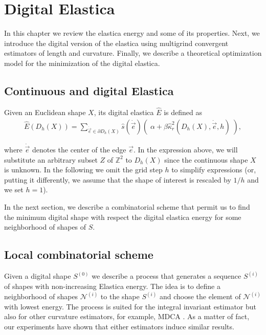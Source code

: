 \chapter{Digital Elastica}
\label{chapter:digital-elastica}

In this chapter we review the elastica energy and some of its properties. Next, we introduce the digital version of the elastica using multigrind convergent estimators of length and curvature. Finally, we describe a theoretical optimization model for the minimization of the digital elastica.

\section{Continuous and digital Elastica}
\label{ch6:sec:continuous-digital-elastica}
	
	
	Given an Euclidean shape $X$, its digital elastica $\hat{E}$ is defined as
	\begin{align}
	\hat{E}( D_h(X) ) = \sum_{\dot{\vec{e}} \in \partial D_h(X)}{ \hat{s}( \dot{\vec{e}})\left(\; \alpha + \beta \hat{\kappa}_{r}^2(D_h(X),\dot{\vec{e}},h) \; \right)},
	\label{eq:digital-elastica}
	\end{align}
	
where $\dot{\vec{e}}$ denotes the center of the edge $\vec{e}$. In the
expression above, we will substitute an arbitrary subset $Z$ of
$\mathbb{Z}^2$ to $D_h(X)$ since the continuous shape $X$ is unknown.
In the following we omit the grid step $h$ to simplify expressions
(or, putting it differently, we assume that the shape of interest is
rescaled by $1/h$ and we set $h=1$). 

In the next section, we describe a combinatorial scheme that permit us to find the minimum digital shape with respect the digital elastica energy for some neighborhood of shapes of $S$. 

\section{Local combinatorial scheme}
\label{ch6:sec:local-combinatorial-scheme}

Given a digital shape $S^{(0)}$ we describe a process that generates a
sequence $S^{(i)}$ of shapes with non-increasing Elastica energy. The
idea is to define a neighborhood of shapes $\mathcal{N}^{(i)}$ to the
shape $S^{(i)}$ and choose the element of $\mathcal{N}^{(i)}$ with
lowest energy.  The process is suited for the integral invariant
estimator but also for other curvature estimators, for example, MDCA
\cite{roussillon11mdca}. As a matter of fact, our experiments have
shown that either estimators induce similar results.

